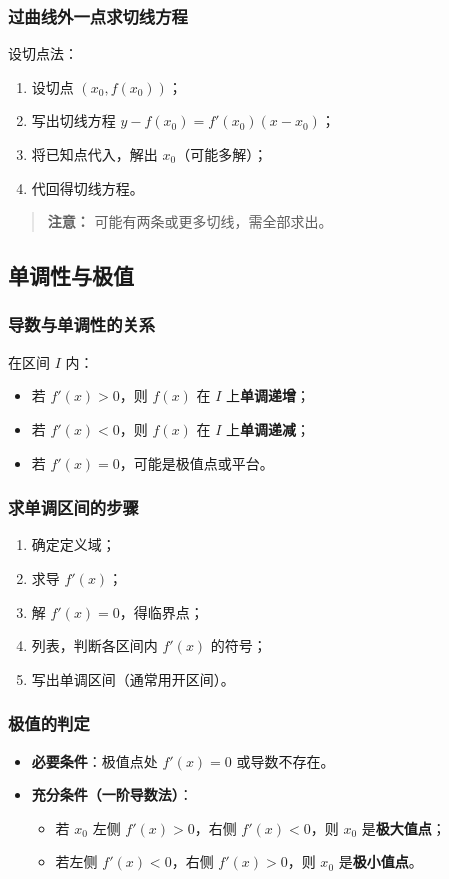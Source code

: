 \documentclass[10pt]{article}
\begin{document}
\subsubsection{过曲线外一点求切线方程}
设切点法：
\begin{enumerate}
    \item 设切点 $(x_0,f(x_0))$；
    \item 写出切线方程 $y-f(x_0)=f'(x_0)(x-x_0)$；
    \item 将已知点代入，解出 $x_0$（可能多解）；
    \item 代回得切线方程。
\end{enumerate}
\begin{quote}
    \textbf{注意：} 可能有两条或更多切线，需全部求出。
\end{quote}

\subsection{单调性与极值}
\subsubsection{导数与单调性的关系}
在区间 $I$ 内：
\begin{itemize}
    \item 若 $f'(x)>0$，则 $f(x)$ 在 $I$ 上\textbf{单调递增}；
    \item 若 $f'(x)<0$，则 $f(x)$ 在 $I$ 上\textbf{单调递减}；
    \item 若 $f'(x)=0$，可能是极值点或平台。
\end{itemize}

\subsubsection{求单调区间的步骤}
\begin{enumerate}
    \item 确定定义域；
    \item 求导 $f'(x)$；
    \item 解 $f'(x)=0$，得临界点；
    \item 列表，判断各区间内 $f'(x)$ 的符号；
    \item 写出单调区间（通常用开区间）。
\end{enumerate}

\subsubsection{极值的判定}
\begin{itemize}
    \item \textbf{必要条件}：极值点处 $f'(x)=0$ 或导数不存在。
    \item \textbf{充分条件（一阶导数法）}：
    \begin{itemize}
        \item 若 $x_0$ 左侧 $f'(x)>0$，右侧 $f'(x)<0$，则 $x_0$ 是\textbf{极大值点}；
        \item 若左侧 $f'(x)<0$，右侧 $f'(x)>0$，则 $x_0$ 是\textbf{极小值点}。
    \end{itemize}
\end{itemize}
\end{document}
